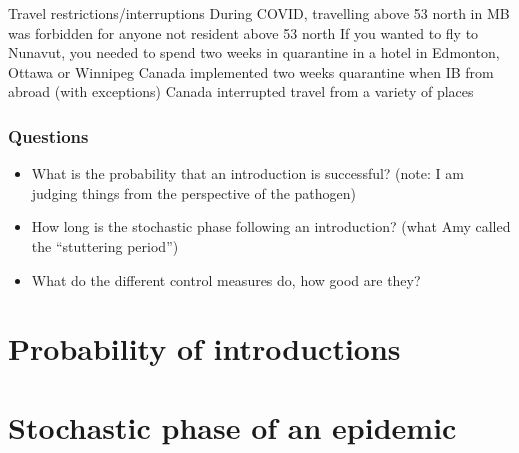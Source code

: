 \documentclass[aspectratio=169]{beamer}\usepackage[]{graphicx}\usepackage[]{xcolor}
\begin{document}

\begin{frame}{Travel restrictions/interruptions}
During COVID, travelling above 53 north in MB was forbidden for anyone not resident above 53 north	
\vfill
If you wanted to fly to Nunavut, you needed to spend two weeks in quarantine in a hotel in Edmonton, Ottawa or Winnipeg
\vfill
Canada implemented two weeks quarantine when IB from abroad (with exceptions)
\vfill
Canada interrupted travel from a variety of places
\end{frame}


\begin{frame}\frametitle{Questions}
	\begin{itemize}
		\item What is the probability that an introduction is successful? \newline (note: I am judging things from the perspective of the pathogen)
		\vfill
		\item How long is the stochastic phase following an introduction?
		\newline (what Amy called the ``stuttering period'')
		\vfill
		\item What do the different control measures do, how good are they?
	\end{itemize}
\end{frame}


\section{Probability of introductions}


\section{Stochastic phase of an epidemic}
\end{document}
